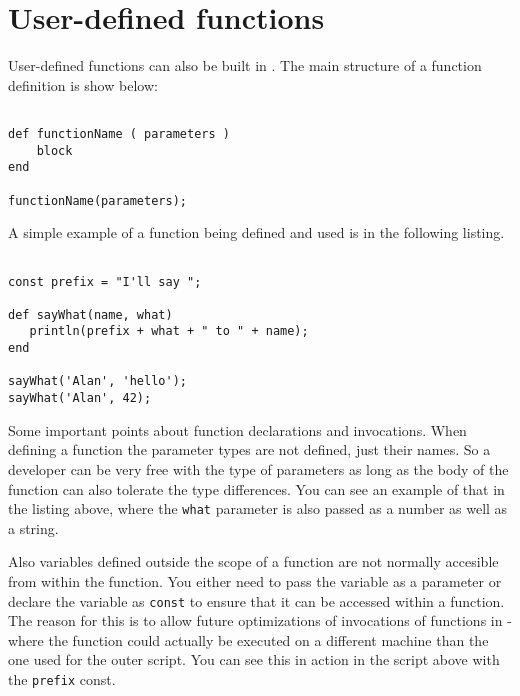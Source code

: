 \chapter{User-defined functions}
User-defined functions  can also be built in \Reflex. The main structure of a function definition is show below:
\begin{Verbatim}

def functionName ( parameters )
    block
end

functionName(parameters);

\end{Verbatim}
A simple example of a function being defined and used is in the following listing.

\begin{lstlisting}[caption={Function definition}]

const prefix = "I'll say ";

def sayWhat(name, what)
   println(prefix + what + " to " + name);
end

sayWhat('Alan', 'hello');
sayWhat('Alan', 42);

\end{lstlisting}

Some important points about function declarations and invocations. When defining a function the parameter types are not defined, just their names. So a developer can be very free with the type of parameters as long as the body of the function can also tolerate the type differences. You can see an example of that in the listing above, where the \Verb+what+ parameter is also passed as a number as well as a string.

Also variables defined outside the scope of a function are not normally accesible from within the function. You either need to pass the variable as a parameter or declare the variable as \Verb+const+ to ensure that it can be accessed within a function. The reason for this is to allow future optimizations of invocations of functions in \Reflex - where the function could actually be executed on a different machine than the one used for the outer script. You can see this in action in the script above with the \verb+prefix+ const.
